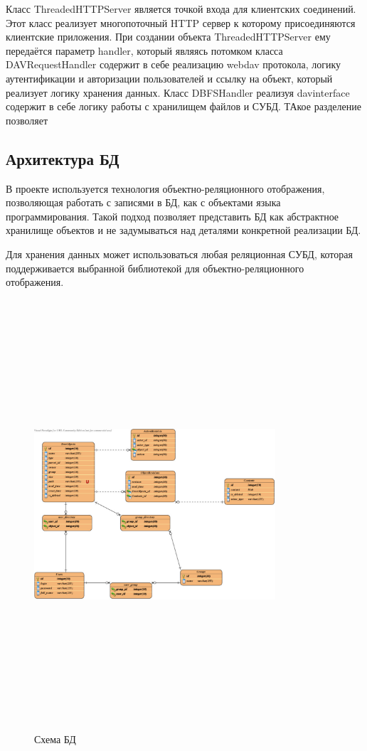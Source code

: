 \documentclass[utf8,usehyperref,12pt]{G7-32}
\begin{document}
Класс ThreadedHTTPServer является точкой входа для клиентских соединений. Этот класс реализует многопоточный HTTP сервер к которому присоединяются клиентские приложения. При создании объекта ThreadedHTTPServer ему передаётся параметр handler, который являясь потомком класса DAVRequestHandler содержит в себе реализацию webdav протокола, логику аутентификации и авторизации пользователей и ссылку на объект, который реализует логику хранения данных. Класс DBFSHandler реализуя davinterface содержит в себе логику работы с хранилищем файлов и СУБД. ТАкое разделение позволяет 

 
\subsection{Архитектура БД}

В проекте используется технология объектно-реляционного отображения, позволяющая работать с записями в БД, как с объектами языка программирования. Такой подход позволяет представить БД как абстрактное хранилище объектов и не задумываться над деталями конкретной реализации БД.

Для хранения данных может использоваться любая реляционная СУБД, которая поддерживается выбранной библиотекой для объектно-реляционного отображения.

\begin{figure}[ht]
   \centering%
   \includegraphics[height=160mm, width=0.8\textwidth, clip, keepaspectratio]{pictures/DB}
   \caption{Схема БД}\label{fig:db_scheme}
 \end{figure}
\end{document}
